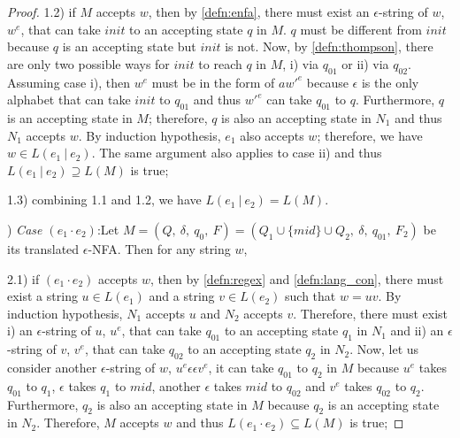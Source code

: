 \begin{proof}
\par 1.2) if \(M\) accepts \(w\), then by \autoref{defn:enfa}, there must exist an
\(\epsilon\)-string of \(w\), \(w^e\), that can take \(init\) to an
accepting state \(q\) in \(M\). \(q\) must be different from \(init\) because
\(q\) is an accepting state but \(init\) is not. Now, by
\autoref{defn:thompson}, there are only two possible ways for \(init\) to reach \(q\) in \(M\), i)
via \(q_{01}\) or ii) via \(q_{02}\). Assuming case i), then \(w^e\)
must be in the form of \(aw'^e\) because \(\epsilon\) is the only alphabet that can take
\(init\) to \(q_{01}\) and thus \(w'^e\) can take \(q_{01}\) to \(q\). Furthermore, \(q\) is an
accepting state in \(M\); therefore, \(q\) is also an accepting
state in \(N_1\) and thus \(N_1\) accepts \(w\). By induction hypothesis, \(e_1\) also accepts \(w\);
therefore, we have \(w \in L(e_1\ |\ e_2)\). The same argument also
applies to case ii) and thus \(L(e_1\ |\ e_2) \supseteq L(M)\) is true; 

\par 1.3) combining 1.1 and 1.2, we have \(L(e_1\ |\ e_2) = L(M)\). 

\par {}) \textit{Case \((e_1 \cdot e_2)\)}:\quad Let \(M = (Q,\
\delta,\ q_0,\ F) = (Q_1 \cup \{mid\} \cup Q_2,\ \delta,\ q_{01},\
F_2)\) be its translated \(\epsilon\)-NFA. Then for any string
\(w\), 

\par 2.1) if \((e_1 \cdot e_2)\) accepts \(w\), then by
\autoref{defn:regex} and \autoref{defn:lang_con}, there must exist a string \(u \in L(e_1)\) and a string \(v \in L(e_2)\) such that \(w
= uv\). By induction hypothesis, \(N_1\) accepts \(u\) and \(N_2\)
accepts \(v\). Therefore, there must exist i) an \(\epsilon\)-string
of \(u\), \(u^e\), that can take \(q_{01}\) to an accepting state \(q_1\) in
\(N_1\) and ii) an \(\epsilon\)-string of \(v\), \(v^e\), that can take
\(q_{02}\) to an accepting state \(q_2\) in \(N_2\). Now, let us
consider another \(\epsilon\)-string of \(w\), \(u^e\epsilon \epsilon
v^e\), it can take \(q_{01}\) to \(q_2\) in \(M\) because \(u^e\) takes
\(q_{01}\) to \(q_1\), \(\epsilon\) takes \(q_1\) to \(mid\), another
\(\epsilon\) takes \(mid\) to \(q_{02}\) and \(v^e\) takes \(q_{02}\)
to \(q_2\). Furthermore, \(q_2\)
is also an accepting state in \(M\) because \(q_2\) is an accepting
state in \(N_2\). Therefore, \(M\) accepts \(w\)
and thus \(L(e_1 \cdot e_2) \subseteq L(M)\) is true; 


\end{proof}
